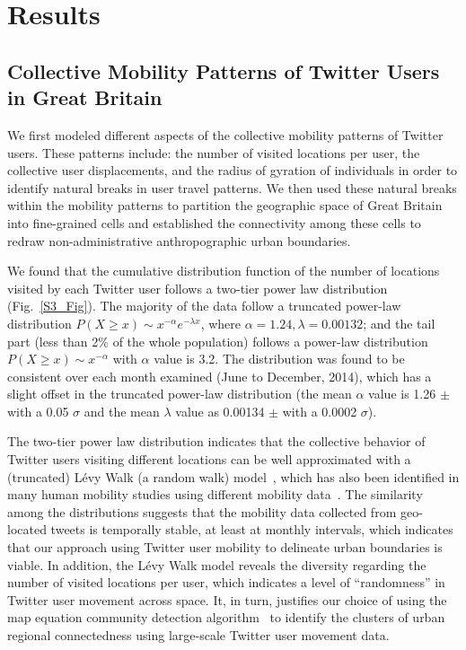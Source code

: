 \documentclass[]{tGIS2e}
\begin{document}
\section{Results}
\subsection{Collective Mobility Patterns of Twitter Users in Great Britain}
We first modeled different aspects of the collective mobility patterns of Twitter users.
These patterns include: the number of visited locations per user,  the collective user displacements, and the radius of gyration of individuals in order to identify natural breaks in user travel patterns.
We then used these natural breaks within the mobility patterns to partition the geographic space of Great Britain into fine-grained cells and established the connectivity among these cells to redraw non-administrative anthropographic urban boundaries. 

We found that the cumulative distribution function of the number of locations visited by each Twitter user follows a two-tier power law distribution (Fig.~\ref{S3_Fig}). 
The majority of the data follow a truncated power-law distribution $P(X\geq x)\sim x^{-\alpha}e^{-\lambda x}$, where $\alpha = 1.24, \lambda =0.00132$; and the tail part (less than 2$\%$ of the whole population) follows a power-law distribution  $P(X \geq x)\sim x^{-\alpha}$ with $\alpha$ value is 3.2.
The distribution was found to be consistent over each month examined (June to December, 2014), which has a slight offset in the truncated power-law distribution (the mean $\alpha$ value is 1.26 $ \pm$ with a 0.05 $\sigma$ and the mean $\lambda$ value as 0.00134 $ \pm$  with a 0.0002 $\sigma$). 

The two-tier power law distribution indicates that the collective behavior of Twitter users visiting different locations can be well approximated with a (truncated) L\'{e}vy Walk (a random walk) model~\citep{rhee2011,reynolds2012}, which has also been identified in many human mobility studies using different mobility data~\citep{zhao2015}.
The similarity among the distributions suggests that the mobility data collected from geo-located tweets is temporally stable, at least at monthly intervals, which indicates that our approach using Twitter user mobility to delineate urban boundaries is viable.  
In addition, the L\'{e}vy Walk model reveals the diversity regarding the number of visited locations per user, which indicates a level of ``randomness'' in Twitter user movement across space. 
It, in turn, justifies our choice of using the map equation community detection algorithm~\citep{rosvall2008} to identify the clusters of urban regional connectedness using large-scale Twitter user movement data.
\end{document}
